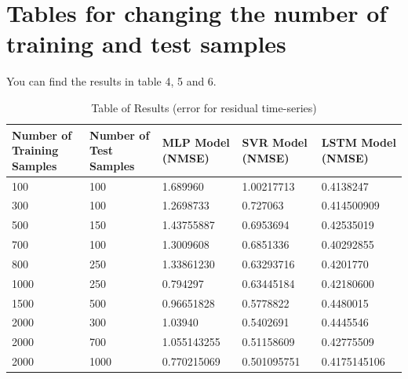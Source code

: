 \documentclass{article}
\begin{document}
\section{Tables for changing the number of training and test samples}

You can find the results in table 4, 5 and 6.

\begin{table}[htb!]
	\centering
	\begin{tabular}{p{2cm} p{2cm} p{2cm} p{2cm} p{2cm}}
		\toprule
		Number of Training Samples & Number of Test Samples & MLP Model (NMSE) & SVR Model (NMSE) & LSTM Model (NMSE) \\
		\midrule
		100 & 100 & 1.689960 & 1.00217713 & 0.4138247 \\
		\midrule
		300 & 100 & 1.2698733 & 0.727063  & 0.414500909 \\
		\midrule
		500 & 150 & 1.43755887 & 0.6953694 & 0.42535019 \\
		\midrule
		700 & 100 & 1.3009608 & 0.6851336 & 0.40292855 \\
		\midrule
		800 & 250 & 1.33861230 & 0.63293716 & 0.4201770 \\
		\midrule
		1000 & 250 & 0.794297 & 0.63445184 & 0.42180600 \\
		\midrule
		1500 & 500 & 0.96651828 & 0.5778822 & 0.4480015 \\
		\midrule
		2000 & 300 & 1.03940 & 0.5402691 & 0.4445546 \\
		\midrule
		2000 & 700 & 1.055143255 & 0.51158609 & 0.42775509 \\
		\midrule
		2000 & 1000 & 0.770215069 & 0.501095751 & 0.4175145106 \\
		\bottomrule
	\end{tabular}
	\caption{Table of Results (error for residual time-series)}
\end{table}
\end{document}
